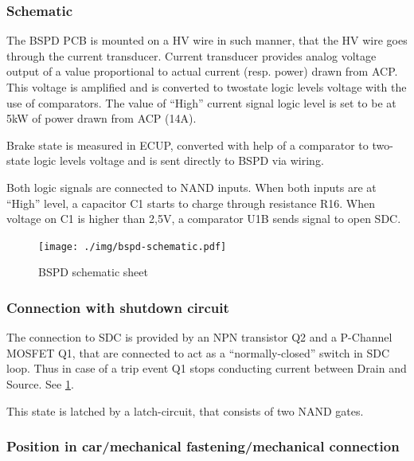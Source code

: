 \subsubsection{Schematic}
The BSPD PCB is mounted on a HV wire in such manner, that the HV wire goes through the
current transducer. Current transducer provides analog voltage output of a value proportional to
actual current (resp. power) drawn from ACP. This voltage is amplified and is converted to twostate
logic levels voltage with the use of comparators. The value of “High” current signal logic level
is set to be at 5kW of power drawn from ACP (14A).

Brake state is measured in ECUP, converted with help of a comparator to two-state logic levels
voltage and is sent directly to BSPD via wiring.

Both logic signals are connected to NAND inputs. When both inputs are at “High” level, a
capacitor C1 starts to charge through resistance R16. When voltage on C1 is higher than 2,5V, a
comparator U1B sends signal to open SDC.

\begin{figure}[H]
	\centering
	\texttt{[image: ./img/bspd-schematic.pdf]}
	\caption{BSPD schematic sheet}
	\label{fig:BSPD-schematic}
\end{figure}

\subsubsection{Connection with shutdown circuit}
The connection to SDC is provided by an NPN transistor Q2 and a P-Channel MOSFET Q1, that
are connected to act as a “normally-closed” switch in SDC loop. Thus in case of a trip event Q1
stops conducting current between Drain and Source. See \ref{fig:BSPD-schematic}.

This state is latched by a latch-circuit, that consists of two NAND gates.

\subsubsection{Position in car/mechanical fastening/mechanical connection}


